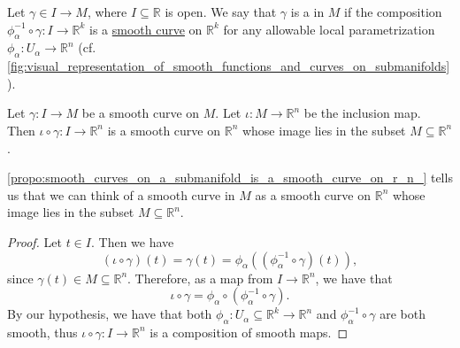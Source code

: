 \documentclass[notoc,notitlepage]{tufte-book}
\begin{document}

\begin{defn}\label{defn:smooth_curve_on_a_submanifold}
  Let $\gamma \in I \to M$, where $I \subseteq \mathbb{R}$ is open. We say that
  $\gamma$ is a  in $M$ if the composition
  $\phi_\alpha^{-1} \circ \gamma : I \to \mathbb{R}^k$ is a
  \hyperref[defn:smooth_curve]{smooth curve}  on $\mathbb{R}^k$ for any allowable local
  parametrization $\phi_\alpha : U_\alpha \to \mathbb{R}^n$ (cf.
  \cref{fig:visual_representation_of_smooth_functions_and_curves_on_submanifolds}).
\end{defn}

\begin{propo}\label{propo:smooth_curves_on_a_submanifold_is_a_smooth_curve_on_r_n_}
  Let $\gamma : I \to M$ be a smooth curve on $M$. Let $\iota : M \to
  \mathbb{R}^n$ be the inclusion map. Then $\iota \circ \gamma : I \to
  \mathbb{R}^n$ is a smooth curve on $\mathbb{R}^n$ whose image lies in the
  subset $M \subseteq \mathbb{R}^n$.
\end{propo}

\begin{remark}
  \cref{propo:smooth_curves_on_a_submanifold_is_a_smooth_curve_on_r_n_} tells us
  that we can think of a smooth curve in $M$ as a smooth curve on $\mathbb{R}^n$
  whose image lies in the subset $M \subseteq \mathbb{R}^n$.
\end{remark}

\begin{proof}
  Let $t \in I$. Then we have
  \begin{equation*}
    (\iota \circ \gamma)(t) = \gamma(t) = \phi_\alpha ((\phi_\alpha^{-1} \circ \gamma)(t)),
  \end{equation*}
  since $\gamma(t) \in M \subseteq \mathbb{R}^n$. Therefore, as a map from $I
  \to \mathbb{R}^n$, we have that
  \begin{equation*}
    \iota \circ \gamma = \phi_\alpha \circ ( \phi_\alpha^{-1} \circ \gamma ).
  \end{equation*}
  By our hypothesis, we have that both $\phi_\alpha : U_\alpha \subseteq \mathbb{R}^k
  \to \mathbb{R}^n$ and $\phi_\alpha^{-1} \circ \gamma$ are both smooth, thus
  $\iota \circ \gamma : I \to \mathbb{R}^n$ is a composition of smooth maps.
\end{proof}
\end{document}
